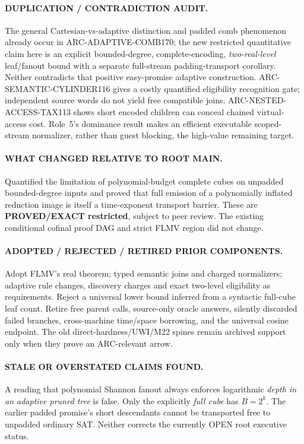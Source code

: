 \documentclass[11pt]{article}
\begin{document}
\paragraph{DUPLICATION / CONTRADICTION AUDIT.}
The general Cartesian-vs-adaptive distinction and padded comb phenomenon already occur in ARC-ADAPTIVE-COMB170; the new restricted quantitative claim here is an explicit bounded-degree, complete-encoding, \emph{two-real-level} leaf/fanout bound with a separate full-stream padding-transport corollary. Neither contradicts that positive easy-promise adaptive construction. ARC-SEMANTIC-CYLINDER116 gives a costly quantified eligibility recognition gate; independent source words do not yield free compatible joins. ARC-NESTED-ACCESS-TAX113 shows short encoded children can conceal chained virtual-access cost. Role~5's dominance result makes an efficient executable scoped-stream normalizer, rather than guest blocking, the high-value remaining target.

\paragraph{WHAT CHANGED RELATIVE TO ROOT MAIN.}
Quantified the limitation of polynomial-budget complete cubes on unpadded bounded-degree inputs and proved that full emission of a polynomially inflated reduction image is itself a time-exponent transport barrier. These are \textbf{PROVED/EXACT restricted}, subject to peer review. The existing conditional cofinal proof DAG and strict FLMV region did not change.

\paragraph{ADOPTED / REJECTED / RETIRED PRIOR COMPONENTS.}
Adopt FLMV's real theorem; typed semantic joins and charged normalizers; adaptive rule changes, discovery charges and exact two-level eligibility as requirements. Reject a universal lower bound inferred from a syntactic full-cube leaf count. Retire free parent calls, source-only oracle answers, silently discarded failed branches, cross-machine time/space borrowing, and the universal cosine endpoint. The old direct-hardness/UWI/M22 spines remain archived support only when they prove an ARC-relevant arrow.

\paragraph{STALE OR OVERSTATED CLAIMS FOUND.}
A reading that polynomial Shannon fanout always enforces logarithmic \emph{depth in an adaptive pruned tree} is false. Only the explicitly \emph{full cube} has $B=2^k$. The earlier padded promise's short descendants cannot be transported free to unpadded ordinary SAT. Neither corrects the currently OPEN root executive status.
\end{document}
